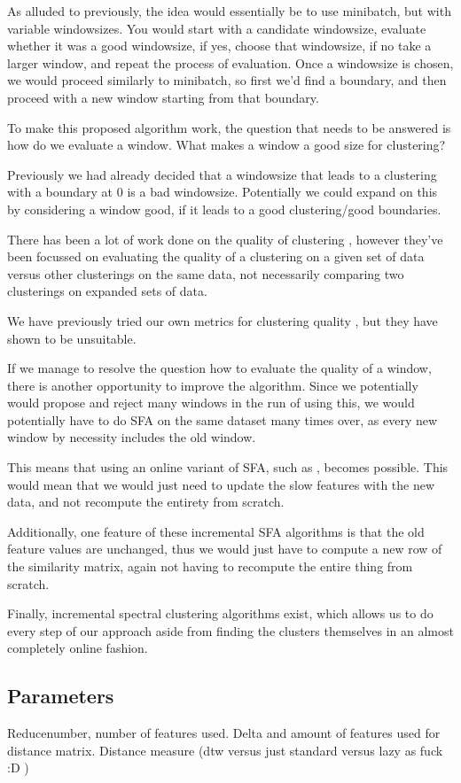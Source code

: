 As alluded to previously, the idea would essentially be to use minibatch, but with variable windowsizes. You would start with a candidate windowsize, evaluate whether it was a good windowsize, if yes, choose that windowsize, if no take a larger window, and repeat the process of evaluation. Once a windowsize is chosen, we would proceed similarly to minibatch, so first we'd find a boundary, and then proceed with a new window starting from that boundary.

To make this proposed algorithm work, the question that needs to be answered is how do we evaluate a window. What makes a window a good size for clustering?

Previously we had already decided that a windowsize that leads to a clustering with a boundary at $0$ is a bad windowsize. Potentially we could expand on this by considering a window good, if it leads to a good clustering/good boundaries.

There has been a lot of work done on the quality of clustering , however they've been focussed on evaluating the quality of a clustering on a given set of data versus other clusterings on the same data, not necessarily comparing two clusterings on expanded sets of data. 

We have previously tried our own metrics for clustering quality , but they have shown to be unsuitable.


If we manage to resolve the question how to evaluate the quality of a window, there is another opportunity to improve the algorithm. Since we potentially would propose and reject many windows in the run of using this, we would potentially have to do SFA on the same dataset many times over, as every new window by necessity includes the old window.

This means that using an online variant of SFA, such as , becomes possible. This would mean that we would just need to update the slow features with the new data, and not recompute the entirety from scratch.

Additionally, one feature of these incremental SFA algorithms is that the old feature values are unchanged, thus we would just have to compute a new row of the similarity matrix, again not having to recompute the entire thing from scratch.

Finally, incremental spectral clustering algorithms exist,  which allows us to do every step of our approach aside from finding the clusters themselves in an almost completely online fashion. 

\subsection{Parameters}
Reducenumber, number of features used. Delta and amount of features used for distance matrix. Distance measure (dtw versus just standard versus lazy as fuck :D )
